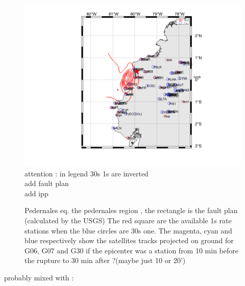 \documentclass{gji}
\begin{document}
        
        
\begin{figure}
\begin{center}
\includegraphics[width=1\linewidth]{images/ped1S30S.png}
attention : in legend 30s 1s are inverted\\
add fault plan \\
add ipp 
\end{center}
\caption{  Pedernales eq. the pedernales region , the rectangle is the fault plan (calculated by the USGS) The red square are the available 1s rate stations when the blue circles are 30s one. The magenta, cyan and blue respectively show the satellites tracks projected on ground for G06, G07 and G30 if the epicenter was a station from 10 min before the rupture to 30 min after ?(maybe just 10 or 20') }
\label{SituationMap}
\end{figure}
probably mixed with :
\end{document}
